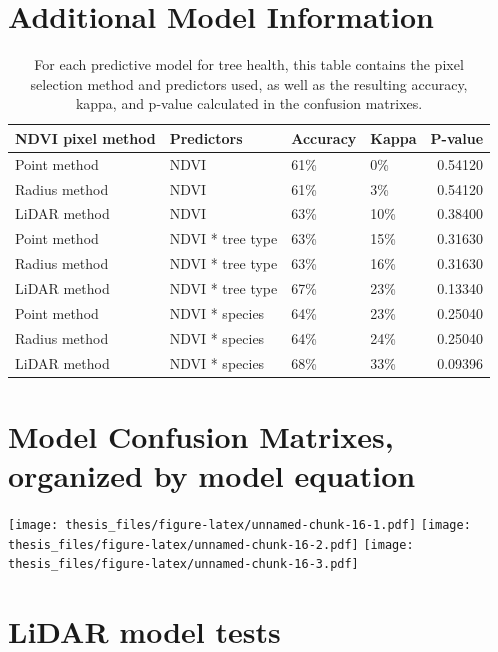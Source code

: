 \documentclass[12pt,twoside]{reedthesis}
\begin{document}
\hypertarget{additional-model-information}{%
\section*{Additional Model Information}\label{additional-model-information}}
\begin{longtable}[t]{llllr}
\caption[Summary of results from various predictive models]{\label{tab:model-table}For each predictive model for tree health, this table contains the pixel selection method and predictors used, as well as the resulting accuracy, kappa, and p-value calculated in the confusion matrixes.}\\
\toprule
NDVI pixel method & Predictors & Accuracy & Kappa & P-value\\
\midrule
Point method & NDVI & 61\% & 0\% & 0.54120\\
Radius method & NDVI & 61\% & 3\% & 0.54120\\
LiDAR method & NDVI & 63\% & 10\% & 0.38400\\
Point method & NDVI * tree type & 63\% & 15\% & 0.31630\\
Radius method & NDVI * tree type & 63\% & 16\% & 0.31630\\
\addlinespace
LiDAR method & NDVI * tree type & 67\% & 23\% & 0.13340\\
Point method & NDVI * species & 64\% & 23\% & 0.25040\\
Radius method & NDVI * species & 64\% & 24\% & 0.25040\\
LiDAR method & NDVI * species & 68\% & 33\% & 0.09396\\
\bottomrule
\end{longtable}
\hypertarget{model-confusion-matrixes-organized-by-model-equation}{%
\section*{Model Confusion Matrixes, organized by model equation}\label{model-confusion-matrixes-organized-by-model-equation}}

\texttt{[image: thesis\_files/figure-latex/unnamed-chunk-16-1.pdf]} \texttt{[image: thesis\_files/figure-latex/unnamed-chunk-16-2.pdf]} \texttt{[image: thesis\_files/figure-latex/unnamed-chunk-16-3.pdf]}

\hypertarget{lidar-model-tests}{%
\section*{LiDAR model tests}\label{lidar-model-tests}}
\end{document}
